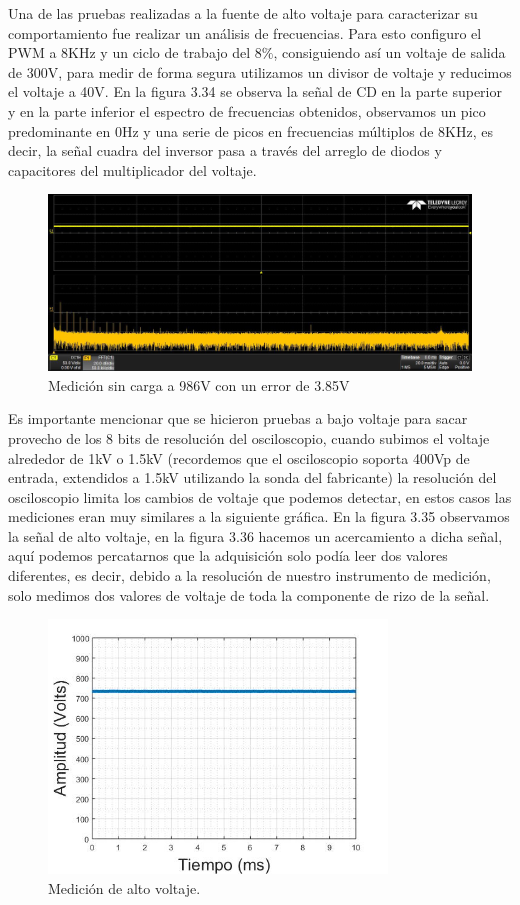 Una de las pruebas realizadas a la fuente de alto voltaje para caracterizar su comportamiento fue realizar un análisis de frecuencias. Para esto configuro el PWM a 8KHz y un ciclo de trabajo del 8$\%$, consiguiendo así un voltaje de salida de 300V, para medir de forma segura utilizamos un divisor de voltaje y reducimos el voltaje a 40V. En la figura 3.34 se observa la señal de CD en la parte superior y en la parte inferior el espectro de frecuencias obtenidos, observamos un pico predominante en 0Hz y una serie de picos en frecuencias múltiplos de 8KHz, es decir, la señal cuadra del inversor pasa a través del arreglo de diodos y capacitores del multiplicador del voltaje.

\begin{figure}[H]
\centering
\includegraphics[width=12cm]{Capitulo3/figs/four.jpg}
\caption{Medición sin carga a 986V con un error de 3.85V}
\end{figure}

Es importante mencionar que se hicieron pruebas a bajo voltaje para sacar provecho de los 8 bits de resolución del osciloscopio, cuando subimos el voltaje alrededor de 1kV o 1.5kV (recordemos que el osciloscopio soporta 400Vp de entrada, extendidos a 1.5kV utilizando la sonda del fabricante) la resolución del osciloscopio limita los cambios de voltaje que podemos detectar, en estos casos las mediciones eran muy similares a la siguiente gráfica. En la figura 3.35 observamos la señal de alto voltaje, en la figura 3.36 hacemos un acercamiento a dicha señal, aquí podemos percatarnos que la adquisición solo podía leer dos valores diferentes, es decir, debido a la resolución de nuestro instrumento de medición, solo medimos dos valores de voltaje de toda la componente de rizo de la señal. 

\begin{figure}[H]
\centering
\includegraphics[width=9cm]{Capitulo3/figs/MS.jpg}
\caption{Medición de alto voltaje. }
\end{figure}

